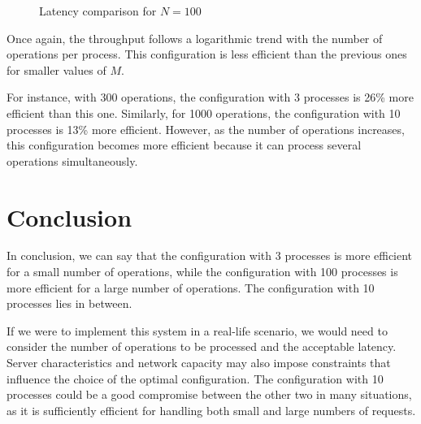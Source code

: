 \documentclass{article}
\begin{document}
\begin{figure}[ht!]
    \centering
    \caption{Latency comparison for \( N = 100 \)}
\end{figure}

Once again, the throughput follows a logarithmic trend with the number of operations
per process. This configuration is less efficient than the previous ones for smaller
values of $M$.

For instance, with 300 operations, the configuration with 3 processes is 26\% more
efficient than this one. Similarly, for 1000 operations, the configuration with 10
processes is 13\% more efficient. However, as the number of operations increases,
this configuration becomes more efficient because it can process several operations
simultaneously.

\newpage

\section{Conclusion}
In conclusion, we can say that the configuration with 3 processes is more
efficient for a small number of operations, while the configuration with 100
processes is more efficient for a large number of operations. The configuration
with 10 processes lies in between.

If we were to implement this system in a real-life scenario, we would need to
consider the number of operations to be processed and the acceptable latency.
Server characteristics and network capacity may also impose constraints that
influence the choice of the optimal configuration. The configuration with 10
processes could be a good compromise between the other two in many situations,
as it is sufficiently efficient for handling both small and large numbers of requests.
\end{document}
